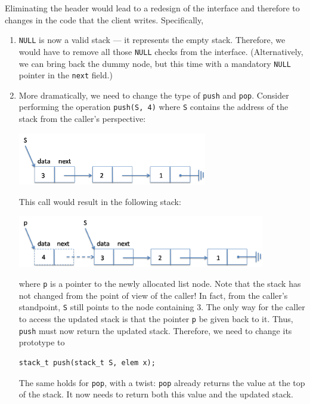 Eliminating the header would lead to a redesign of the interface and
therefore to changes in the code that the client writes.
Specifically,
\begin{enumerate}
\item%
  \lstinline'NULL' is now a valid stack --- it represents the empty
  stack.  Therefore, we would have to remove all those
  \lstinline'NULL' checks from the interface.  (Alternatively, we
  can bring back the dummy node, but this time with a mandatory
  \lstinline'NULL' pointer in the \lstinline'next' field.)
\item%
  More dramatically, we need to change the type of \lstinline'push'
  and \lstinline'pop'.  Consider performing the operation
  \lstinline'push(S, 4)' where \lstinline'S' contains the address of
  the stack from the caller's perspective:
  \begin{center}
    \includegraphics[width=0.65\textwidth]{img/stackC.png}
  \end{center}
  This call would result in the following stack:
  \begin{center}
    \includegraphics[width=0.85\textwidth]{img/stackC-push.png}
  \end{center}
  where \lstinline'p' is a pointer to the newly allocated list node.
  Note that the stack has not changed from the point of view of the
  caller!  In fact, from the caller's standpoint,  \lstinline'S' still
  points to the node containing 3.  The only way for the caller to
  access the updated stack is that the pointer
  \lstinline'p' be given back to it.  Thus, \lstinline'push' must now
  return the updated stack.  Therefore, we need to change its
  prototype to
\begin{lstlisting}[language={[C0]C}]
stack_t push(stack_t S, elem x);
\end{lstlisting}
  The same holds for \lstinline'pop', with a twist: \lstinline'pop'
  already returns the value at the top of the stack.  It now needs to
  return both this value and the updated stack.
\end{enumerate}
